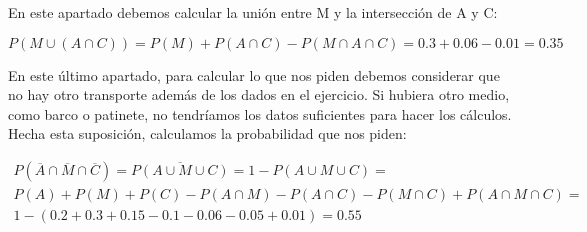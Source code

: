 \subproblem
En este apartado debemos calcular la unión entre M y la intersección de A y C:

\begin{equation*}
    P(M \cup (A \cap C)) = P(M) + P(A \cap C) - P(M \cap A \cap C) = 0.3 + 0.06 - 0.01 = 0.35
\end{equation*}

\subproblem
En este último apartado, para calcular lo que nos piden debemos considerar que no hay otro transporte además de los dados en el ejercicio. Si hubiera otro medio, como barco o patinete, no tendríamos los datos suficientes para hacer los cálculos. Hecha esta suposición, calculamos la probabilidad que nos piden:

\begin{gather*}
    P(\overline{A} \cap \overline{M} \cap \overline{C}) = \overline{P(A \cup M \cup C)} = 1 - P(A \cup M \cup C) = \\ P(A) + P(M) + P(C) - P(A \cap M) - P(A \cap C) - P(M \cap C) + P(A \cap M \cap C) =\\ 1 - (0.2 + 0.3 + 0.15 - 0.1 - 0.06 - 0.05 + 0.01) = 0.55
\end{gather*}
